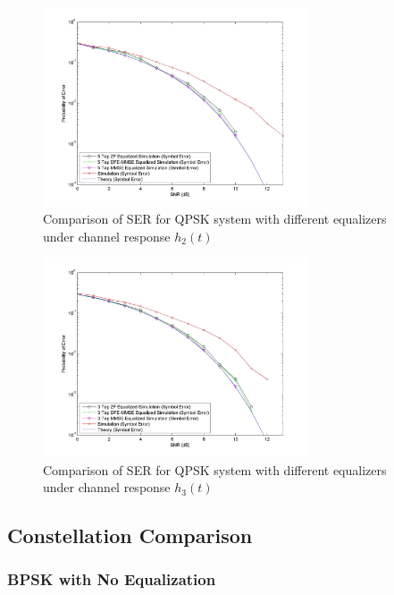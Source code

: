 \documentclass[]{article}
\begin{document}
\begin{figure}[H]
\centering
\includegraphics[width=0.7\textwidth]{qpSNR2.jpg}
\caption{Comparison of SER for QPSK system with different equalizers under channel response $h_2(t)$}
\end{figure}

\begin{figure}[H]
\centering
\includegraphics[width=0.7\textwidth]{qpSNR3.jpg}
\caption{Comparison of SER for QPSK system with different equalizers under channel response $h_3(t)$}
\end{figure}

\newpage
\subsection{Constellation Comparison}
\label{sec:constCompare}

\subsubsection{BPSK with No Equalization}
\end{document}
